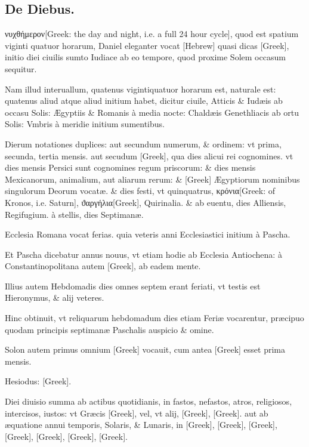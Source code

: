 \subsection{De Diebus.}
\setcounter{parcount}{0}
\begin{parnumbers}

\textgreek{νυχθήμερον[Greek: the day and night, i.e. a full 24 hour cycle]}, quod est spatium viginti quatuor horarum, Daniel eleganter vocat \texthebrew{[Hebrew]} quasi dicas \textgreek{[Greek]}, initio diei ciuilis sumto Iudiace ab eo tempore, quod proxime Solem occasum sequitur.

Nam illud interuallum, quatenus vigintiquatuor horarum est, naturale est: quatenus aliud atque aliud initium habet, dicitur ciuile, Atticis \& Iudæis ab occasu Solis: Ægyptiis \& Romanis à media nocte: Chaldæis Genethliacis ab ortu Solis: Vmbris à meridie initium  sumentibus.

Dierum notationes duplices: aut secundum numerum, \& ordinem: vt prima, secunda, tertia mensis. aut secudum \textgreek{[Greek]}, qua dies alicui rei cognomines. vt dies mensis Persici sunt cognomines regum priscorum: \& dies mensis Mexicanorum, animalium, aut aliarum rerum: \& \textgreek{[Greek]} Ægyptiorum nominibus singulorum Deorum vocatæ. \& dies festi, vt quinquatrus, \textgreek{κρόνια[Greek: of Kronos, i.e. Saturn]}, \textgreek{ϑαργήλια[Greek]}, Quirinalia. \& ab euentu, dies Alliensis, Regifugium. à stellis, dies Septimanæ.

Ecclesia Romana vocat ferias. quia veteris anni Ecclesiastici initium à Pascha.

Et Pascha dicebatur annus nouus, vt etiam hodie ab Ecclesia Antiochena: à Constantinopolitana autem \textgreek{[Greek]}, ab eadem mente.

Illius autem Hebdomadis dies omnes septem erant  feriati, vt testis est Hieronymus, \& alij veteres.

Hinc obtinuit, vt reliquarum hebdomadum dies etiam Feriæ vocarentur, præcipuo quodam principis septimanæ Paschalis auspicio \& omine.

Solon autem primus omnium \textgreek{[Greek]} vocauit, cum antea \textgreek{[Greek]} esset prima mensis.

Hesiodus: \textgreek{[Greek]}.

Diei diuisio summa ab actibus quotidianis, in fastos, nefastos, atros, religiosos, intercisos, iustos: vt Græcis \textgreek{[Greek]}, vel, vt alij, \textgreek{[Greek]}, \textgreek{[Greek]}. aut ab æquatione annui temporis, Solaris, \& Lunaris, in \textgreek{[Greek]}, \textgreek{[Greek]}, \textgreek{[Greek]}, \textgreek{[Greek]}, \textgreek{[Greek]}, \textgreek{[Greek]}, \textgreek{[Greek]}.


\end{parnumbers}

